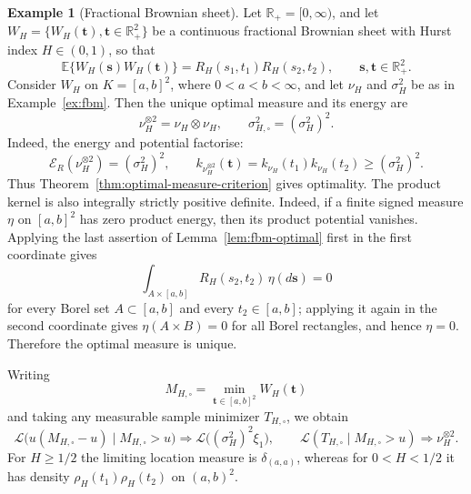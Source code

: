 \documentclass[11pt]{amsart}
\theoremstyle{definition}
\newtheorem{example}[example]{Example}
\theoremstyle{remark}
\newcommand{\Ee}{\mathbb E}
\begin{document}
\begin{example}[Fractional Brownian sheet]
Let $\mathbb R_+=[0,\infty)$, and let
$W_H=\{W_H(\boldsymbol t),\boldsymbol t\in\mathbb R_+^2\}$ be a
continuous fractional Brownian sheet with Hurst index $H\in(0,1)$, so that
\[
 \Ee\bigl\{W_H(\boldsymbol s)W_H(\boldsymbol t)\bigr\}
 =R_H(s_1,t_1)R_H(s_2,t_2),
 \qquad \boldsymbol s,\boldsymbol t\in\mathbb R_+^2.
\]
Consider $W_H$ on $K=[a,b]^2$, where $0<a<b<\infty$, and let
$\nu_H$ and $\sigma_H^2$ be as in Example~\ref{ex:fbm}.  Then the unique
optimal measure and its energy are
\[
 \nu_H^{\otimes2}=\nu_H\otimes\nu_H,\qquad
 \sigma_{H,\square}^2=(\sigma_H^2)^2.
\]
Indeed, the energy and potential factorise:
\[
 \mathcal E_R(\nu_H^{\otimes2})=(\sigma_H^2)^2,
 \qquad
 k_{\nu_H^{\otimes2}}(\boldsymbol t)
 =k_{\nu_H}(t_1)k_{\nu_H}(t_2)
 \geq(\sigma_H^2)^2.
\]
Thus Theorem~\ref{thm:optimal-measure-criterion} gives optimality.
The product kernel is also integrally strictly positive definite.  Indeed,
if a finite signed measure $\eta$ on $[a,b]^2$ has zero product energy,
then its product potential vanishes.  Applying the last assertion of
Lemma~\ref{lem:fbm-optimal} first in the first coordinate gives
\[
 \int_{A\times[a,b]}R_H(s_2,t_2)\,\eta(d\boldsymbol s)=0
\]
for every Borel set $A\subset[a,b]$ and every $t_2\in[a,b]$; applying it
again in the second coordinate gives $\eta(A\times B)=0$ for all Borel
rectangles, and hence $\eta=0$.  Therefore the optimal measure is unique.

Writing
\[
 M_{H,\square}=\min_{\boldsymbol t\in[a,b]^2}W_H(\boldsymbol t)
\]
and taking any measurable sample minimizer $T_{H,\square}$, we obtain
\[
 \mathcal L\bigl(u(M_{H,\square}-u)\mid M_{H,\square}>u\bigr)
 \Longrightarrow
 \mathcal L\bigl((\sigma_H^2)^2\xi_1\bigr),
 \qquad
 \mathcal L(T_{H,\square}\mid M_{H,\square}>u)
 \Longrightarrow\nu_H^{\otimes2}.
\]
For $H\geq1/2$ the limiting location measure is $\delta_{(a,a)}$,
whereas for $0<H<1/2$ it has density
$\rho_H(t_1)\rho_H(t_2)$ on $(a,b)^2$.
\end{example}
\end{document}

